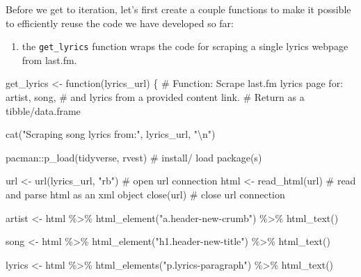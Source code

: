 \documentclass[
  letterpaper,
]{latex/krantz}
\newenvironment{Shaded}{\begin{snugshade}}{\end{snugshade}}
\newcommand{\CommentTok}[1]{\textcolor[rgb]{0.37,0.37,0.37}{#1}}
\newcommand{\ControlFlowTok}[1]{\textcolor[rgb]{0.00,0.23,0.31}{#1}}
\newcommand{\FunctionTok}[1]{\textcolor[rgb]{0.28,0.35,0.67}{#1}}
\newcommand{\NormalTok}[1]{\textcolor[rgb]{0.00,0.23,0.31}{#1}}
\newcommand{\OtherTok}[1]{\textcolor[rgb]{0.00,0.23,0.31}{#1}}
\newcommand{\SpecialCharTok}[1]{\textcolor[rgb]{0.37,0.37,0.37}{#1}}
\newcommand{\StringTok}[1]{\textcolor[rgb]{0.13,0.47,0.30}{#1}}
\providecommand{\tightlist}{%
  \setlength{\itemsep}{0pt}\setlength{\parskip}{0pt}}\usepackage{longtable,booktabs,array}
\begin{document}
Before we get to iteration, let's first create a couple functions to
make it possible to efficiently reuse the code we have developed so far:

\begin{enumerate}
\def\labelenumi{\arabic{enumi}.}
\tightlist
\item
  the \texttt{get\_lyrics} function wraps the code for scraping a single
  lyrics webpage from last.fm.
\end{enumerate}

\begin{Shaded}
\begin{Highlighting}[]
\NormalTok{get\_lyrics }\OtherTok{\textless{}{-}} \ControlFlowTok{function}\NormalTok{(lyrics\_url) \{}
  \CommentTok{\# Function: Scrape last.fm lyrics page for: artist, song, }
  \CommentTok{\# and lyrics from a provided content link. }
  \CommentTok{\# Return as a tibble/data.frame}
  
  \FunctionTok{cat}\NormalTok{(}\StringTok{"Scraping song lyrics from:"}\NormalTok{, lyrics\_url, }\StringTok{"}\SpecialCharTok{\textbackslash{}n}\StringTok{"}\NormalTok{)}
  
\NormalTok{  pacman}\SpecialCharTok{::}\FunctionTok{p\_load}\NormalTok{(tidyverse, rvest) }\CommentTok{\# install/ load package(s)}
  
\NormalTok{  url }\OtherTok{\textless{}{-}} \FunctionTok{url}\NormalTok{(lyrics\_url, }\StringTok{"rb"}\NormalTok{) }\CommentTok{\# open url connection }
\NormalTok{  html }\OtherTok{\textless{}{-}} \FunctionTok{read\_html}\NormalTok{(url) }\CommentTok{\# read and parse html as an xml object}
  \FunctionTok{close}\NormalTok{(url) }\CommentTok{\# close url connection}
  
\NormalTok{  artist }\OtherTok{\textless{}{-}} 
\NormalTok{    html }\SpecialCharTok{\%\textgreater{}\%} 
    \FunctionTok{html\_element}\NormalTok{(}\StringTok{"a.header{-}new{-}crumb"}\NormalTok{) }\SpecialCharTok{\%\textgreater{}\%} 
    \FunctionTok{html\_text}\NormalTok{()}
  
\NormalTok{  song }\OtherTok{\textless{}{-}} 
\NormalTok{    html }\SpecialCharTok{\%\textgreater{}\%} 
    \FunctionTok{html\_element}\NormalTok{(}\StringTok{"h1.header{-}new{-}title"}\NormalTok{) }\SpecialCharTok{\%\textgreater{}\%} 
    \FunctionTok{html\_text}\NormalTok{()}
  
\NormalTok{  lyrics }\OtherTok{\textless{}{-}} 
\NormalTok{    html }\SpecialCharTok{\%\textgreater{}\%} 
    \FunctionTok{html\_elements}\NormalTok{(}\StringTok{"p.lyrics{-}paragraph"}\NormalTok{) }\SpecialCharTok{\%\textgreater{}\%} 
    \FunctionTok{html\_text}\NormalTok{()}
  

\end{Highlighting}
\end{Shaded}
\end{document}
